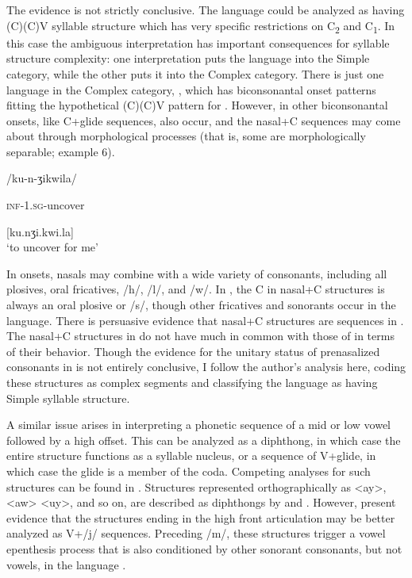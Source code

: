   The  evidence is not strictly conclusive. The language could be analyzed as having (C)(C)V syllable structure which has very specific restrictions on C\textsubscript{2} and C\textsubscript{1}. In this case the ambiguous interpretation has important consequences for syllable structure complexity: one interpretation puts the language into the Simple category, while the other puts it into the Complex category. There is just one language in the Complex category, , which has biconsonantal onset patterns fitting the hypothetical (C)(C)V pattern for . However, in  other biconsonantal onsets, like C+glide sequences, also occur, and the nasal+C sequences may come about through morphological processes (that is, some are morphologically separable; example 6).

\ea\label{ex:4.6}

/ku-n-ʒikwila/

\textsc{inf}-\textsc{1.sg}-uncover

[ku.nʒi.kwi.la]\\
\glt ‘to uncover for me’
\citep[24]{Kawasha2003}
\z

In  onsets, nasals may combine with a wide variety of consonants, including all plosives, oral fricatives, /h/, /l/, and /w/. In , the C in nasal+C structures is always an oral plosive or /s/, though other fricatives and sonorants occur in the language. There is persuasive evidence that nasal+C structures are sequences in . The nasal+C structures in  do not have much in common with those of  in terms of their behavior. Though the evidence for the unitary status of prenasalized consonants in  is not entirely conclusive, I follow the author’s analysis here, coding these structures as complex segments and classifying the language as having Simple syllable structure. 

  A similar issue arises in interpreting a phonetic sequence of a mid or low vowel followed by a high offset. This can be analyzed as a diphthong, in which case the entire structure functions as a syllable nucleus, or a sequence of V+glide, in which case the glide is a member of the coda. Competing analyses for such structures can be found in . Structures represented orthographically as <ay>, <aw> <uy>, and so on, are described as diphthongs by \citet{Jansen2010} and \citet{RigsbyRude1996}. However, \citet{HargusBeavert2006} present evidence that the structures ending in the high front articulation may be better analyzed as V+/j/ sequences. Preceding /m/, these structures trigger a vowel epenthesis process that is also conditioned by other sonorant consonants, but not vowels, in the language .\pagebreak

